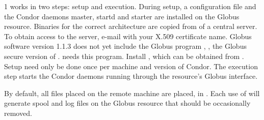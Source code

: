 \begin{ManPage}{\label{man-condor-glidein}}{1}
 works in two steps: setup and execution.
During setup, a configuration file and the Condor daemons
master, startd and starter are installed on the Globus
resource.
Binaries for the correct architecture are copied from of a central server.
To obtain access to the server,
e-mail  with your X.509
certificate name.
Globus software version 1.1.3 does not yet include
the Globus program ,
, the Globus secure version of .
 needs this program.
Install , which can be obtained from
.
Setup need only be done once per machine and version of Condor.
The execution step starts the Condor daemons running through
the resource's Globus interface.

By default, all files placed on the remote machine are placed, in
.
Each use of  will generate spool and log
files on the Globus resource that should be occasionally removed.


\end{ManPage}
